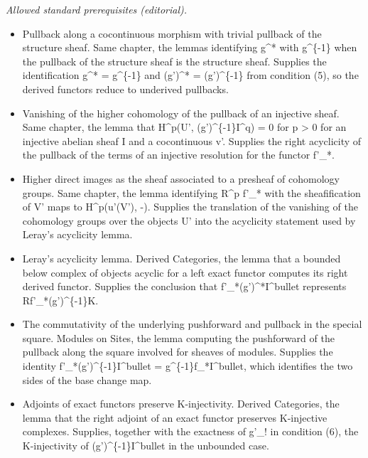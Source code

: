\documentclass[10pt,a4paper]{amsart}
\theoremstyle{plain}
\theoremstyle{definition}
\theoremstyle{remark}
\numberwithin{equation}{subsection}
\begin{document}
\noindent\textit{Allowed standard prerequisites (editorial).}\begin{itemize}
\item Pullback along a cocontinuous morphism with trivial pullback of the structure sheaf. Same chapter, the lemmas identifying g\textasciicircum{}* with g\textasciicircum{}\{-1\} when the pullback of the structure sheaf is the structure sheaf. Supplies the identification g\textasciicircum{}* = g\textasciicircum{}\{-1\} and (g')\textasciicircum{}* = (g')\textasciicircum{}\{-1\} from condition (5), so the derived functors reduce to underived pullbacks.
\item Vanishing of the higher cohomology of the pullback of an injective sheaf. Same chapter, the lemma that H\textasciicircum{}p(U', (g')\textasciicircum{}\{-1\}I\textasciicircum{}q) = 0 for p > 0 for an injective abelian sheaf I and a cocontinuous v'. Supplies the right acyclicity of the pullback of the terms of an injective resolution for the functor f'\_*.
\item Higher direct images as the sheaf associated to a presheaf of cohomology groups. Same chapter, the lemma identifying R\textasciicircum{}p f'\_* with the sheafification of V' maps to H\textasciicircum{}p(u'(V'), -). Supplies the translation of the vanishing of the cohomology groups over the objects U' into the acyclicity statement used by Leray's acyclicity lemma.
\item Leray's acyclicity lemma. Derived Categories, the lemma that a bounded below complex of objects acyclic for a left exact functor computes its right derived functor. Supplies the conclusion that f'\_*(g')\textasciicircum{}*I\textasciicircum{}bullet represents Rf'\_*(g')\textasciicircum{}\{-1\}K.
\item The commutativity of the underlying pushforward and pullback in the special square. Modules on Sites, the lemma computing the pushforward of the pullback along the square involved for sheaves of modules. Supplies the identity f'\_*(g')\textasciicircum{}\{-1\}I\textasciicircum{}bullet = g\textasciicircum{}\{-1\}f\_*I\textasciicircum{}bullet, which identifies the two sides of the base change map.
\item Adjoints of exact functors preserve K-injectivity. Derived Categories, the lemma that the right adjoint of an exact functor preserves K-injective complexes. Supplies, together with the exactness of g'\_! in condition (6), the K-injectivity of (g')\textasciicircum{}\{-1\}I\textasciicircum{}bullet in the unbounded case.
\end{itemize}\medskip
\end{document}
